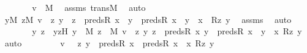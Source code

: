 \begin{isabellebody}
\ \ \ \ \isamarkupfalse%
\ \isamarkupfalse%
\ {\isachardoublequoteopen}v\ {\isasymin}\ M{\isachardoublequoteclose}\ \isamarkupfalse%
\ assms\ transM\ \isamarkupfalse%
\ auto\isanewline
\ \ \ \ \isamarkupfalse%
\ \isamarkupfalse%
\ {\isachardoublequoteopen}{\isacharparenleft}{\kern0pt}{\isasymexists}y{\isasymin}M{\isachardot}{\kern0pt}\ {\isasymexists}z{\isasymin}M{\isachardot}{\kern0pt}\ v\ {\isacharequal}{\kern0pt}\ {\isasymlangle}z{\isacharcomma}{\kern0pt}\ y{\isasymrangle}\ {\isasymand}\ z\ {\isasymin}\ preds{\isacharparenleft}{\kern0pt}R{\isacharcomma}{\kern0pt}\ x{\isacharparenright}{\kern0pt}\ {\isasymand}\ {\isacharparenleft}{\kern0pt}y\ {\isasymin}\ preds{\isacharparenleft}{\kern0pt}R{\isacharcomma}{\kern0pt}\ x{\isacharparenright}{\kern0pt}\ {\isasymor}\ y\ {\isacharequal}{\kern0pt}\ x{\isacharparenright}{\kern0pt}\ {\isasymand}\ R{\isacharparenleft}{\kern0pt}z{\isacharcomma}{\kern0pt}\ y{\isacharparenright}{\kern0pt}{\isacharparenright}{\kern0pt}{\isachardoublequoteclose}\ \isamarkupfalse%
\ assms{}\ \isamarkupfalse%
\ auto\ \isanewline
\ \ \ \ \isamarkupfalse%
\ \isamarkupfalse%
\ y\ z\ \ yzH\ {\isacharcolon}{\kern0pt}{\isachardoublequoteopen}y\ {\isasymin}\ M{\isachardoublequoteclose}\ {\isachardoublequoteopen}z\ {\isasymin}\ M{\isachardoublequoteclose}\ {\isachardoublequoteopen}v\ {\isacharequal}{\kern0pt}\ {\isacharless}{\kern0pt}z{\isacharcomma}{\kern0pt}\ y{\isachargreater}{\kern0pt}{\isachardoublequoteclose}\ {\isachardoublequoteopen}z\ {\isasymin}\ preds{\isacharparenleft}{\kern0pt}R{\isacharcomma}{\kern0pt}\ x{\isacharparenright}{\kern0pt}{\isachardoublequoteclose}\ {\isachardoublequoteopen}y\ {\isasymin}\ preds{\isacharparenleft}{\kern0pt}R{\isacharcomma}{\kern0pt}\ x{\isacharparenright}{\kern0pt}\ {\isasymor}\ y\ {\isacharequal}{\kern0pt}\ x{\isachardoublequoteclose}\ {\isachardoublequoteopen}R{\isacharparenleft}{\kern0pt}z{\isacharcomma}{\kern0pt}\ y{\isacharparenright}{\kern0pt}{\isachardoublequoteclose}\ \isamarkupfalse%
\ auto\ \isanewline
\ \ \ \ \isamarkupfalse%
\ \isamarkupfalse%
\ {\isachardoublequoteopen}v\ {\isasymin}\ {\isacharbraceleft}{\kern0pt}\ {\isacharless}{\kern0pt}z{\isacharcomma}{\kern0pt}\ y{\isachargreater}{\kern0pt}\ {\isasymin}\ preds{\isacharparenleft}{\kern0pt}R{\isacharcomma}{\kern0pt}\ x{\isacharparenright}{\kern0pt}\ {\isasymtimes}\ {\isacharparenleft}{\kern0pt}preds{\isacharparenleft}{\kern0pt}R{\isacharcomma}{\kern0pt}\ x{\isacharparenright}{\kern0pt}\ {\isasymunion}\ {\isacharbraceleft}{\kern0pt}x{\isacharbraceright}{\kern0pt}{\isacharparenright}{\kern0pt}{\isachardot}{\kern0pt}\ R{\isacharparenleft}{\kern0pt}z{\isacharcomma}{\kern0pt}\ y{\isacharparenright}{\kern0pt}\ {\isacharbraceright}{\kern0pt}{\isachardoublequoteclose}\ \isamarkupfalse%

\end{isabellebody}
